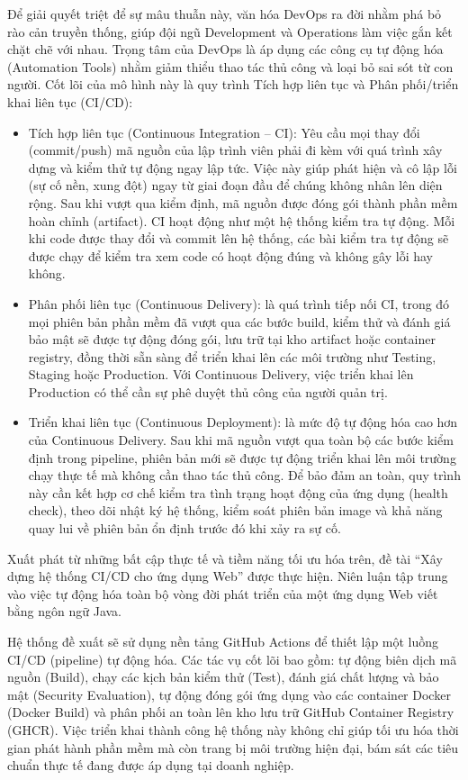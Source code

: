 \documentclass[12pt,a4paper,oneside]{extreport}
\begin{document}
Để giải quyết triệt để sự mâu thuẫn này, văn hóa DevOps ra đời nhằm phá bỏ rào
cản truyền thống, giúp đội ngũ Development và Operations làm việc gắn kết chặt
chẽ với nhau. Trọng tâm của DevOps là áp dụng các công cụ tự động hóa
(Automation Tools) nhằm giảm thiểu thao tác thủ công và loại bỏ sai sót từ con
người. Cốt lõi của mô hình này là quy trình Tích hợp liên tục và Phân
phối/triển khai liên tục (CI/CD):
\begin{itemize}
  \item Tích hợp liên tục (Continuous Integration -- CI): Yêu cầu mọi thay đổi
  (commit/push) mã nguồn của lập trình viên phải đi kèm với quá trình xây dựng
  và kiểm thử tự động ngay lập tức. Việc này giúp phát hiện và cô lập lỗi (sự
  cố nền, xung đột) ngay từ giai đoạn đầu để chúng không nhân lên diện rộng. Sau
  khi vượt qua kiểm định, mã nguồn được đóng gói thành phần mềm hoàn chỉnh
  (artifact). CI hoạt động như một hệ thống kiểm tra tự động. Mỗi khi code được
  thay đổi và commit lên hệ thống, các bài kiểm tra tự động sẽ được chạy để
  kiểm tra xem code có hoạt động đúng và không gây lỗi hay không.
  \item Phân phối liên tục (Continuous Delivery): là quá trình tiếp nối CI,
  trong đó mọi phiên bản phần mềm đã vượt qua các bước build, kiểm thử và đánh
  giá bảo mật sẽ được tự động đóng gói, lưu trữ tại kho artifact hoặc container
  registry, đồng thời sẵn sàng để triển khai lên các môi trường như Testing,
  Staging hoặc Production. Với Continuous Delivery, việc triển khai lên
  Production có thể cần sự phê duyệt thủ công của người quản trị.
  \item Triển khai liên tục (Continuous Deployment): là mức độ tự động hóa cao
  hơn của Continuous Delivery. Sau khi mã nguồn vượt qua toàn bộ các bước kiểm
  định trong pipeline, phiên bản mới sẽ được tự động triển khai lên môi trường
  chạy thực tế mà không cần thao tác thủ công. Để bảo đảm an toàn, quy trình
  này cần kết hợp cơ chế kiểm tra tình trạng hoạt động của ứng dụng (health
  check), theo dõi nhật ký hệ thống, kiểm soát phiên bản image và khả năng quay
  lui về phiên bản ổn định trước đó khi xảy ra sự cố.
\end{itemize}

Xuất phát từ những bất cập thực tế và tiềm năng tối ưu hóa trên, đề tài ``Xây
dựng hệ thống CI/CD cho ứng dụng Web'' được thực hiện. Niên luận tập trung vào
việc tự động hóa toàn bộ vòng đời phát triển của một ứng dụng Web viết bằng
ngôn ngữ Java.

Hệ thống đề xuất sẽ sử dụng nền tảng GitHub Actions để thiết lập một luồng
CI/CD (pipeline) tự động hóa. Các tác vụ cốt lõi bao gồm: tự động biên dịch mã
nguồn (Build), chạy các kịch bản kiểm thử (Test), đánh giá chất lượng và bảo
mật (Security Evaluation), tự động đóng gói ứng dụng vào các container Docker
(Docker Build) và phân phối an toàn lên kho lưu trữ GitHub Container Registry
(GHCR). Việc triển khai thành công hệ thống này không chỉ giúp tối ưu hóa thời
gian phát hành phần mềm mà còn trang bị môi trường hiện đại, bám sát các tiêu
chuẩn thực tế đang được áp dụng tại doanh nghiệp.
\end{document}
